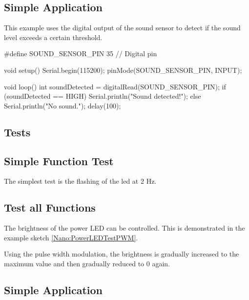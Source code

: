 \subsection{Simple Application}
This example uses the digital output of the sound sensor to detect if the sound level exceeds a certain threshold.

\begin{Arduino}
	#define SOUND_SENSOR_PIN 35  // Digital pin
	
	void setup() {
		Serial.begin(115200);
		pinMode(SOUND_SENSOR_PIN, INPUT);
	}
	
	void loop() {
		int soundDetected = digitalRead(SOUND_SENSOR_PIN);
		if (soundDetected == HIGH) {
			Serial.println("Sound detected!");
		} else {
			Serial.println("No sound.");
		}
		delay(100);
	}
	
	
\end{Arduino}




\subsection{Tests}

\subsection{Simple Function Test}

The simplest test is the flashing of the \ac{led} at 2 Hz.

{
	\label{Nano:PowerLEDTest}
}


\subsection{Test all Functions}

The brightness of the power LED can be controlled. This is demonstrated in the example sketch \ref{Nano:PowerLEDTestPWM}.

Using the pulse width modulation, the brightness is gradually increased to the maximum value and then gradually reduced to 0 again.




{
	\label{Nano:PowerLEDTestPWM}
}

\subsection{Simple Application}


